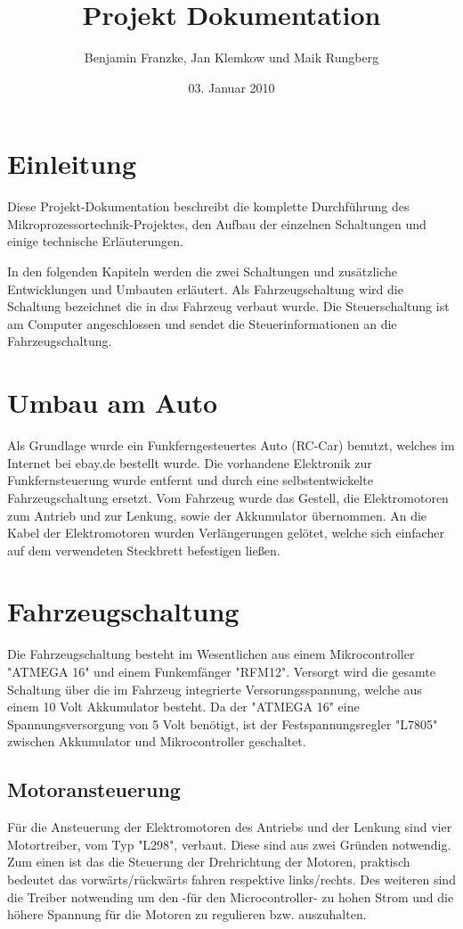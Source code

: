 \documentclass{scrartcl}
\title{Projekt Dokumentation}
\author{Benjamin Franzke, Jan Klemkow und Maik Rungberg}
\date{03. Januar 2010}
\begin{document}
\maketitle
\tableofcontents

\newpage

\section{Einleitung} %
	Diese Projekt-Dokumentation beschreibt die komplette Durchführung des Mikroprozessortechnik-Projektes,
	den Aufbau der einzelnen Schaltungen und einige technische Erläuterungen.

	In den folgenden Kapiteln werden die zwei Schaltungen und zusätzliche Entwicklungen und Umbauten erläutert.
	Als Fahrzeugschaltung wird die Schaltung bezeichnet die in das Fahrzeug verbaut wurde.
	Die Steuerschaltung ist am Computer angeschlossen und sendet die Steuerinformationen an die Fahrzeugschaltung.

\section{Umbau am Auto} %
	Als Grundlage wurde ein Funkferngesteuertes Auto (RC-Car) benutzt,
	welches im Internet bei ebay.de bestellt wurde.
	Die vorhandene Elektronik zur Funkfernsteuerung wurde entfernt
	und durch eine selbstentwickelte Fahrzeugschaltung ersetzt.
	Vom Fahrzeug wurde das Gestell, die Elektromotoren zum Antrieb und zur Lenkung,
	sowie der Akkumulator übernommen.
	An die Kabel der Elektromotoren wurden Verlängerungen gelötet,
	welche sich einfacher auf dem verwendeten Steckbrett befestigen ließen.

\newpage

\section{Fahrzeugschaltung} %
	Die Fahrzeugschaltung besteht im Wesentlichen aus einem Mikrocontroller "ATMEGA 16" und einem Funkemfänger "RFM12".
	Versorgt wird die gesamte Schaltung über die im Fahrzeug integrierte Versorungsspannung,
	welche aus einem 10 Volt Akkumulator besteht.
	Da der "ATMEGA 16" eine Spannungsversorgung von 5 Volt benötigt, ist der Festspannungsregler "L7805"
	zwischen Akkumulator und Mikrocontroller geschaltet.

	\subsection{Motoransteuerung}
		Für die Ansteuerung der Elektromotoren des Antriebs und der Lenkung sind vier Motortreiber, vom Typ "L298", verbaut.
		Diese sind aus zwei Gründen notwendig. Zum einen ist das die Steuerung der Drehrichtung der Motoren, praktisch
		bedeutet das vorwärts/rückwärts fahren respektive links/rechts.
		Des weiteren sind die Treiber notwending um den -für den Microcontroller- zu hohen Strom und die höhere Spannung
		für die Motoren zu regulieren bzw. auszuhalten.
\end{document}
